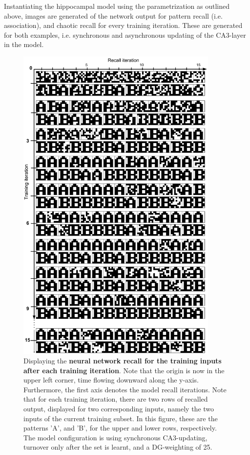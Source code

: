Instantiating the hippocampal model using the parametrization as outlined above, images are generated of the network output for pattern recall (i.e. association), and chaotic recall for every training iteration. These are generated for both examples, i.e. synchronous and asynchronous updating of the CA3-layer in the model.

\begin{figure}
    \centering
    \includegraphics[width=10cm]{fig/AB-pattern-associations-sync-tm0-dgw25}
    \caption{Displaying the \textbf{neural network recall for the training inputs after each training iteration}. Note that the origin is now in the upper left corner, time flowing downward along the y-axis. Furthermore, the first axis denotes the model recall iterations. Note that for each training iteration, there are two rows of recalled output, displayed for two corresponding inputs, namely the two inputs of the current training subset. In this figure, these are the patterns 'A', and 'B', for the upper and lower rows, respectively. The model configuration is using synchronous CA3-updating, turnover only after the set is learnt, and a DG-weighting of 25.}
    \label{fig:pattern_associations_sync}
\end{figure}

